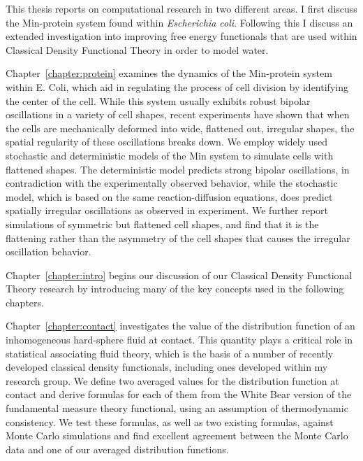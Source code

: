 

This thesis reports on computational research in two different areas.
I first discuss the Min-protein system found within \emph{Escherichia
coli}.  Following this I discuss an extended investigation into
improving free energy functionals that are used within Classical
Density Functional Theory in order to model water.
%

Chapter~\ref{chapter:protein} examines the dynamics of the Min-protein
system within E. Coli, which aid in regulating the process of cell
division by identifying the center of the cell.  While this system
usually exhibits robust bipolar oscillations in a variety of cell
shapes, recent experiments have shown that when the cells are
mechanically deformed into wide, flattened out, irregular shapes, the
spatial regularity of these oscillations breaks down. We employ widely
used stochastic and deterministic models of the Min system to simulate
cells with flattened shapes.  The deterministic model predicts strong
bipolar oscillations, in contradiction with the experimentally
observed behavior, while the stochastic model, which is based on the
same reaction-diffusion equations, does predict spatially irregular
oscillations as observed in experiment.  We further report simulations
of symmetric but flattened cell shapes, and find that it is the
flattening rather than the asymmetry of the cell shapes that causes
the irregular oscillation behavior.
%

Chapter~\ref{chapter:intro} begins our discussion of our Classical
Density Functional Theory research by introducing many of the key
concepts used in the following chapters.
%

Chapter~\ref{chapter:contact} investigates the value of the
distribution function of an inhomogeneous hard-sphere fluid at
contact. This quantity plays a critical role in statistical
associating fluid theory, which is the basis of a number of recently
developed classical density functionals, including ones developed
within my research group. We define two averaged values for the
distribution function at contact and derive formulas for each of them
from the White Bear version of the fundamental measure theory
functional, using an assumption of thermodynamic consistency. We test
these formulas, as well as two existing formulas, against Monte Carlo
simulations and find excellent agreement between the Monte Carlo data
and one of our averaged distribution functions.
%

